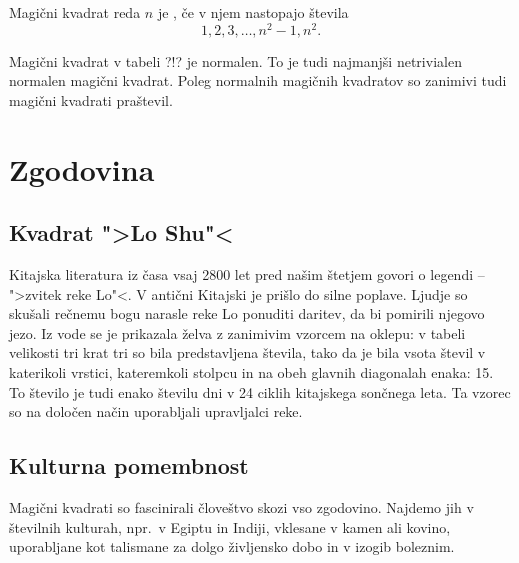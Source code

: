 \documentclass[a4paper,12pt]{article}
\begin{document}
\begin{definicija}
   Magični kvadrat reda $n$ je , če v njem nastopajo števila
   \begin{equation}
      \label{eq:numbers}%
      1, 2, 3, \ldots, n^2-1, n^2.
   \end{equation}
\end{definicija}

Magični kvadrat v tabeli ?!? je normalen.
To je tudi najmanjši netrivialen normalen magični kvadrat.
Poleg normalnih magičnih kvadratov so zanimivi tudi magični kvadrati praštevil.


\section{Zgodovina}

\subsection{Kvadrat ">Lo Shu"<}

Kitajska literatura iz časa vsaj 2800 let pred našim štetjem govori o legendi
 -- ">zvitek reke Lo"<. V antični Kitajski je prišlo do
silne poplave. Ljudje so skušali rečnemu bogu narasle reke Lo ponuditi daritev,
da bi pomirili njegovo jezo. Iz vode se je prikazala želva z zanimivim vzorcem
na oklepu: v tabeli velikosti tri krat tri so bila predstavljena števila, tako
da je bila vsota števil v katerikoli vrstici, kateremkoli stolpcu in na obeh
glavnih diagonalah enaka: 15. To število je tudi enako številu dni v 24 ciklih
kitajskega sončnega leta. Ta vzorec so na določen način uporabljali upravljalci
reke.



\subsection{Kulturna pomembnost}

Magični kvadrati so fascinirali človeštvo skozi vso zgodovino. Najdemo jih
v številnih kulturah, npr.\ v Egiptu in Indiji, vklesane v kamen ali
kovino, uporabljane kot talismane za dolgo življensko dobo in v
izogib boleznim.
\end{document}
